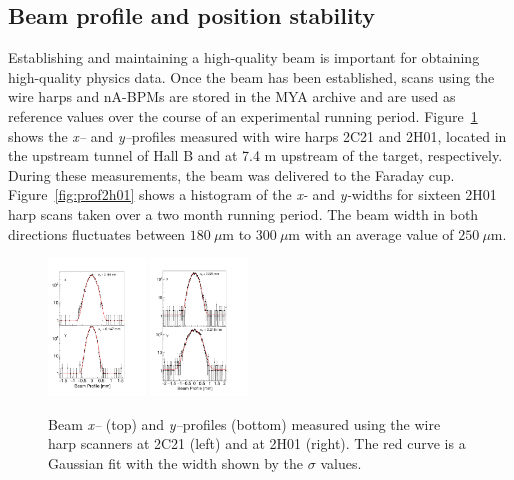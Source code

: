 




\subsection{Beam profile and position stability}

Establishing and maintaining a high-quality beam is important for obtaining high-quality physics data. Once the beam has been established, 
scans using the wire harps and nA-BPMs are stored in the MYA archive and are used as reference values over the course of an experimental
running period. Figure~\ref{fig:profile}  shows the {\it x--} and {\it y--}profiles measured with wire harps 2C21 and 2H01, located in the upstream 
tunnel of Hall B and at 7.4 m upstream of the target, respectively. During these measurements, the beam was delivered to the Faraday cup.
Figure~\ref{fig:prof2h01} shows a histogram of the {\it x-} and {\it y-}widths for sixteen 2H01 harp scans taken over a two month running
period.  The beam width in both directions fluctuates between $180~\mu$m to $300~\mu$m with an average value of $250~\mu$m. 

\begin{figure}[ht]
\begin{center}
\includegraphics[width=0.23\textwidth]{2C21_fits.pdf}
\includegraphics[width=0.23\textwidth]{2H01_fits.pdf}
	\caption{Beam {\it x--} (top) and {\it y--}profiles (bottom) measured using the wire harp scanners at 2C21 (left) and at 2H01 (right). The red
	curve is a Gaussian fit with the width shown by the $\sigma$ values. }
\label{fig:profile}
\end{center}
\end{figure}

